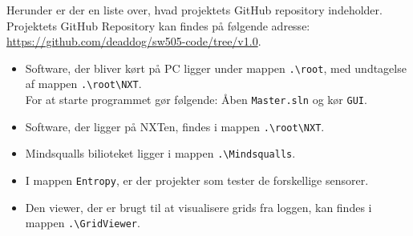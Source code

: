 \label{kildekode}
Herunder er der en liste over, hvad projektets GitHub repository indeholder.
Projektets GitHub Repository kan findes på følgende adresse: \url{https://github.com/deaddog/sw505-code/tree/v1.0}.

\begin{itemize}
\item Software, der bliver kørt på PC ligger under mappen \lstinline[style=c]!.\root!, med undtagelse af mappen \lstinline[style=c]!.\root\NXT!.
\\
For at starte programmet gør følgende:
Åben \lstinline[style=c]!Master.sln! og kør \lstinline[style=c]!GUI!.
\item Software, der ligger på NXTen, findes i mappen \lstinline[style=c]!.\root\NXT!.
\item Mindsqualls bilioteket ligger i mappen \lstinline[style=c]!.\Mindsqualls!.
\item I mappen \lstinline[style=c]!Entropy!, er der projekter som tester de forskellige sensorer.
\item Den viewer, der er brugt til at visualisere grids fra loggen, kan findes i mappen \lstinline[style=c]!.\GridViewer!.

\end{itemize}